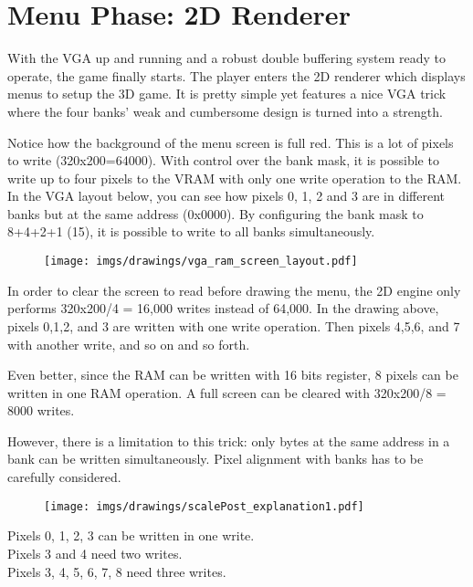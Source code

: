 \section{Menu Phase: 2D Renderer}
With the VGA up and running and a robust double buffering system ready to operate, the game finally starts. The player enters the 2D renderer which displays menus to setup the 3D game. It is pretty simple yet features a nice VGA trick where the four banks' weak and cumbersome design is turned into a strength.
\par
\begin{figure}[H]
\centering
{}
\end{figure}
\par

Notice how the background of the menu screen is full red. This is a lot of pixels to write (320x200=64000). With control over the bank mask, it is possible to write up to four pixels to the VRAM with only one write operation to the RAM. In the VGA layout below, you can see how pixels 0, 1, 2 and 3 are in different banks but at the same address (0x0000). By configuring the bank mask to 8+4+2+1 (15), it is possible to write to all banks simultaneously.\\
\par
\begin{figure}[H]
\centering
\texttt{[image: imgs/drawings/vga\_ram\_screen\_layout.pdf]}
\end{figure}

\par
In order to clear the screen to read before drawing the menu, the 2D engine only performs 320x200/4 = 16,000 writes instead of 64,000. In the drawing above, pixels 0,1,2, and 3 are written with one write operation. Then pixels 4,5,6, and 7 with another write, and so on and so forth.\\
\par
Even better, since the RAM can be written with 16 bits register, 8 pixels can be written in one RAM operation. A full screen can be cleared with 320x200/8 = 8000 writes.
\par
\begin{minipage}{\textwidth}

\end{minipage}
However, there is a limitation to this trick: only bytes at the same address in a bank can be written simultaneously. Pixel alignment with banks has to be carefully considered.\
\par
\begin{figure}[H]
\centering
 \texttt{[image: imgs/drawings/scalePost\_explanation1.pdf]}
 \end{figure}
Pixels 0, 1, 2, 3 can be written in one write.\\
Pixels 3 and 4 need two writes.\\
Pixels 3, 4, 5, 6, 7, 8 need three writes.\\


